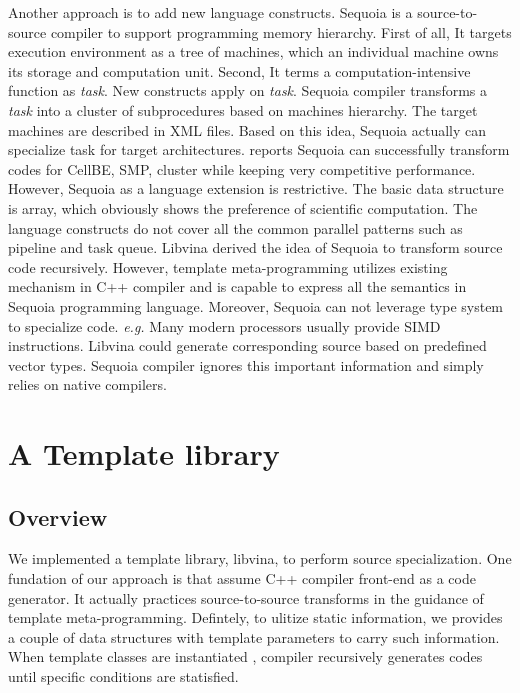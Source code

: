 \documentclass[10pt, conference, compsocconf]{IEEEtran}
\begin{document}
Another approach is to add new language constructs. Sequoia is a source-to-source compiler to support programming memory hierarchy. First of all, It targets execution environment as a tree of machines, which an individual machine owns its storage and computation unit. Second, It terms a computation-intensive function as \textit{task}. New constructs apply on \emph{task}. Sequoia compiler transforms a \textit{task} into a cluster of subprocedures based on machines hierarchy. The target machines are described in XML files. Based on this idea, Sequoia actually can specialize task for target architectures. \cite{b2} reports Sequoia can successfully transform codes for CellBE, SMP, cluster while keeping very competitive performance. However, Sequoia as a language extension is restrictive. The basic data structure is array, which obviously shows the preference of scientific computation. The language constructs do not cover all the common parallel patterns such as pipeline and task queue. Libvina derived the idea of Sequoia to transform source code recursively. However, template meta-programming utilizes existing mechanism in C++ compiler and is capable to express all the semantics in Sequoia programming language. Moreover, Sequoia can not leverage type system to specialize code. \textit{e.g.} Many modern processors usually provide SIMD instructions. Libvina could generate corresponding source based on predefined vector types. Sequoia compiler ignores this important information and simply relies on native compilers.


\section{A Template library}
\subsection{Overview}
We implemented a template library, libvina, to perform source specialization. One fundation of our approach is that assume C++ compiler front-end as a code generator. It actually practices source-to-source transforms in the guidance of template meta-programming. Defintely, to ulitize static information, we provides a couple of data structures with template parameters to carry such information. When template classes are instantiated , compiler recursively generates codes until specific conditions are statisfied.
\end{document}
